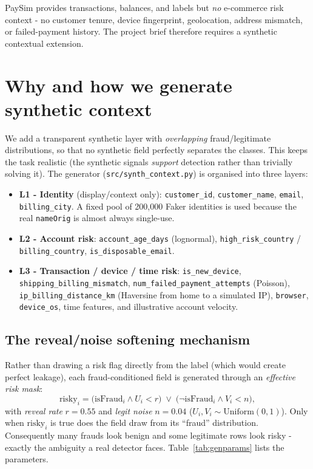 \documentclass[11pt,a4paper]{report}
\newcommand{\code}[1]{\texttt{\small #1}}
\begin{document}
PaySim provides transactions, balances, and labels but \emph{no} e-commerce risk context -
no customer tenure, device fingerprint, geolocation, address mismatch, or failed-payment
history. The project brief therefore requires a synthetic contextual extension.

\section{Why and how we generate synthetic context}

We add a transparent synthetic layer with \emph{overlapping} fraud/legitimate distributions,
so that no synthetic field perfectly separates the classes. This keeps the task realistic
(the synthetic signals \emph{support} detection rather than trivially solving it). The
generator (\code{src/synth\_context.py}) is organised into three layers:

\begin{itemize}[nosep,leftmargin=1.4em]
  \item \textbf{L1 - Identity} (display/context only): \code{customer\_id},
        \code{customer\_name}, \code{email}, \code{billing\_city}. A fixed pool of
        200{,}000 Faker identities is used because the real \code{nameOrig} is almost
        always single-use.
  \item \textbf{L2 - Account risk}: \code{account\_age\_days} (lognormal),
        \code{high\_risk\_country} / \code{billing\_country}, \code{is\_disposable\_email}.
  \item \textbf{L3 - Transaction / device / time risk}: \code{is\_new\_device},
        \code{shipping\_billing\_mismatch}, \code{num\_failed\_payment\_attempts} (Poisson),
        \code{ip\_billing\_distance\_km} (Haversine from home to a simulated IP),
        \code{browser}, \code{device\_os}, time features, and illustrative account velocity.
\end{itemize}

\subsection{The reveal/noise softening mechanism}

Rather than drawing a risk flag directly from the label (which would create perfect
leakage), each fraud-conditioned field is generated through an \emph{effective risk mask}:
\begin{equation}
\text{risky}_i = \big(\text{isFraud}_i \wedge U_i < r\big) \;\vee\; \big(\neg\text{isFraud}_i \wedge V_i < n\big),
\end{equation}
with \emph{reveal rate} $r=0.55$ and \emph{legit noise} $n=0.04$ ($U_i,V_i \sim \text{Uniform}(0,1)$).
Only when $\text{risky}_i$ is true does the field draw from its ``fraud'' distribution.
Consequently many frauds look benign and some legitimate rows look risky - exactly the
ambiguity a real detector faces. Table~\ref{tab:genparams} lists the parameters.
\end{document}
